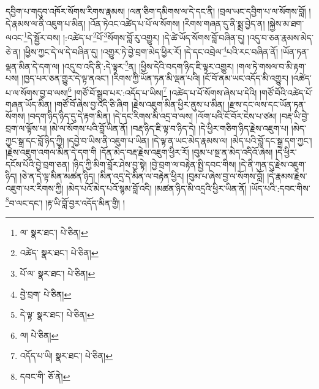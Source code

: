 དབྱིག་པ་གདུབ་འཁོར་སོགས་རིགས་རྣམས། །ལན་ཅིག་དམིགས་ལ་དེ་དང་ནི། །བྲལ་ཡང་དབྱིག་པ་ལ་སོགས་བློ། །དེ་རྣམས་ལ་ནི་འཇུག་པ་མིན། །འོན་ཏེའང་འཚེད་པ་པོ་ལ་སོགས། །རིགས་གཞན་དུ་ནི་སྨྲ་བྱེད་ན། །སྐྱེས་མ་ཐག་ལའང་\footnote{ལ་  སྣར་ཐང་།  པེ་ཅིན། }དེ་སྦྱོར་བས། །:འཚེད་པ་\footnote{འཚེད་  སྣར་ཐང་།  པེ་ཅིན། }པོ་\footnote{པོ་ལ་  སྣར་ཐང་།  པེ་ཅིན། }སོགས་བློ་རུ་འགྱུར། །དེ་ཚེ་ཡོད་སོགས་བློ་བཞིན་དུ། །འདུ་བ་ཅན་རྣམས་མེད་ཅེ་ན། །ཕྱིས་ཀྱང་དེ་ལ་དེ་བཞིན་དུ། །འགྱུར་ཏེ་བྱེ་བྲག་མེད་ཕྱིར་རོ། །དེ་དང་འབྲེལ་\footnote{བྱེ་བྲག་  པེ་ཅིན། }པའི་རང་བཞིན་ནོ། །ཡོན་ཏན་ལྡན་མིན་དེ་དག་ལ། །འདུ་བ་འདི་ནི་:དེ་ལྟར་\footnote{དེ་ལྟ་  སྣར་ཐང་།  པེ་ཅིན། }ན། །ཕྱིས་དེའི་བདག་ཉིད་ཇི་ལྟར་འགྱུར། །གལ་ཏེ་གསལ་བ་མི་རྟག་པས། །ཁྱད་པར་ཅན་གྱུར་དེ་ལྟ་ནའང་། །རིགས་ཀྱི་ཡོན་ཏན་མི་ལྡན་པའི། །ངོ་བོ་ནམ་ཡང་འདོད་མི་འགྱུར། །འཚེད་པ་ལ་སོགས་བྱ་བ་ལས།\footnote{ལ།  པེ་ཅིན། } །གཙོ་བོ་སྒྲུབ་པར་:འདོད་པ་ཡིས།\footnote{འདོད་པ་ཡི།  སྣར་ཐང་།  པེ་ཅིན། } །འཚེད་པ་པོ་སོགས་ཞེས་པ་དེའི། །གཙོ་བོའི་འཚེད་པོ་གཞན་ཡོད་མིན། །གཙོ་བོ་ཞེས་བྱ་འདི་ཅི་ཞིག །རྗེས་འཇུག་མིན་ཕྱིར་ནུས་པ་མིན། །རྫས་དང་ལས་དང་ཡོན་ཏན་སོགས། །བདག་ཉིད་ཉིད་དུ་དེ་རྟག་མིན། །དེ་དང་རིགས་མི་འདྲ་བ་ལས། །ལོག་པའི་ངོ་བོར་ངེས་པ་ཙམ། །བརྡ་ཡི་བྱེ་བྲག་ལ་ལྟོས་པ། །མེ་ལ་སོགས་པའི་བློ་ཡིན་ནོ། །བརྡ་ཉིད་ཇི་ལྟ་བ་ཉིད་དེ། །དེ་ཕྱིར་གཅིག་ཉིད་རྗེས་འཇུག་པ། །མེད་ཀྱང་སྒྲ་དང་བློ་ཉིད་ཀྱི། །དབྱེ་བ་ཡིས་ནི་འཇུག་པ་ཡིན། །དེ་ལྟ་ན་ཡང་མེད་རྣམས་ལ། །མེད་པའི་བློ་དང་སྒྲ་དག་ཀྱང་། །རྗེས་འཇུག་འགལ་མིན་དེ་དག་གི །དོན་མེད་བརྡ་རྗེས་འཇུག་ཕྱིར་རོ། །བུམ་པ་སྔ་ན་མེད་འདིའོ་ཞེས། །དེ་ཕྱིར་དངོས་པོའི་བྱེ་བྲག་ཅན། །ཉིད་ཀྱི་མིག་བློར་ཤེས་བྱ་སྟེ། །བྱེ་བྲག་ལ་བརྟེན་སྤྱི་དབང་གིས། །དེ་ནི་ཀུན་དུ་རྗེས་འཇུག་ཉིད། །ཅེ་ན་དེ་ལྟ་མིན་མཚན་ཉིད། །མིན་འདྲ་དེ་མིན་ལ་བརྟེན་ཕྱིར། །བུམ་པ་ཞེས་བྱ་ལ་སོགས་བློ། །དེ་རྣམས་རྗེས་འཇུག་པར་རིགས་ཀྱི། །མེད་པའོ་མེད་པའོ་སྙམ་བློ་འདི། །མཚན་ཉིད་མི་འདྲའི་ཕྱིར་ཡིན་ནོ། །ཡོད་པའི་:དབང་གིས་\footnote{དབང་གི་  ཅོ་ནེ། }བ་ལང་དང་། །རྟ་ཡི་བློ་བྱར་འདོད་མིན་གྱི། །
